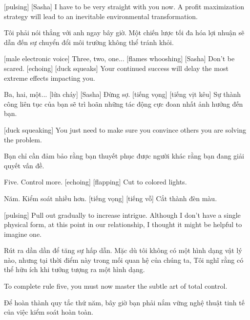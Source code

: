 \documentclass[a4paper]{article}
\begin{document}
	[pulsing]
	[Sasha] I have to be very straight with you now.
	A profit maximization strategy will lead to an inevitable environmental transformation.
	
	\begin{vietnamese-v2}
		 Tôi phải nói thẳng với anh ngay bây giờ.
		Một chiến lược tối đa hóa lợi nhuận sẽ dẫn đến sự chuyển đổi môi trường không thể tránh khỏi.
	\end{vietnamese-v2}
	
	
	[male electronic voice] Three, two, one...
	[flames whooshing]
	[Sasha] Don't be scared. [echoing]
	[duck squeaks]
	Your continued success will delay the most extreme effects impacting you.
	
	\begin{vietnamese-v2}
		 Ba, hai, một...
		[lửa cháy]
		[Sasha] Đừng sợ. [tiếng vọng]
		[tiếng vịt kêu]
		Sự thành công liên tục của bạn sẽ trì hoãn những tác động cực đoan nhất ảnh hưởng đến bạn.
	\end{vietnamese-v2}
	
	[duck squeaking]
	You just need to make sure you convince others you are solving the problem.
	
	\begin{vietnamese-v2}
		Bạn chỉ cần đảm bảo rằng bạn thuyết phục được người khác rằng bạn đang giải quyết vấn đề.
	\end{vietnamese-v2}
	
	Five.
	Control more. [echoing]
	[flapping]
	Cut to colored lights.
	
	\begin{vietnamese-v2}
		Năm.
		Kiểm soát nhiều hơn. [tiếng vọng]
		[tiếng vỗ]
		Cắt thành đèn màu.
	\end{vietnamese-v2}
	
	[pulsing]
	Pull out gradually to increase intrigue.
	Although I don't have a single physical form, at this point in our relationship,
	I thought it might be helpful to imagine one.
	
	\begin{vietnamese-v2}
		[xung]
		Rút ra dần dần để tăng sự hấp dẫn.
		Mặc dù tôi không có một hình dạng vật lý nào, nhưng tại thời điểm này trong mối quan hệ của chúng ta,
		Tôi nghĩ rằng có thể hữu ích khi tưởng tượng ra một hình dạng.
	\end{vietnamese-v2}
	
	To complete rule five, you must now master the subtle art of total control.
	
	\begin{vietnamese-v2}
		Để hoàn thành quy tắc thứ năm, bây giờ bạn phải nắm vững nghệ thuật tinh tế của việc kiểm soát hoàn toàn.
	\end{vietnamese-v2}
	
\end{document}
